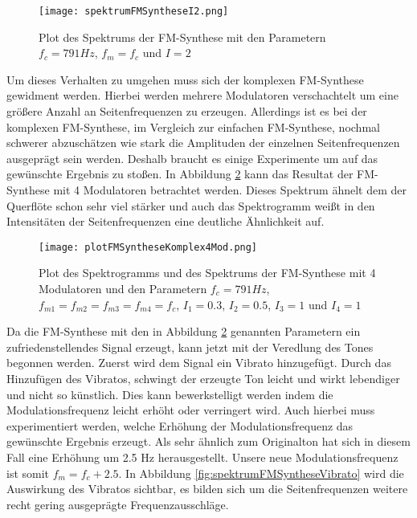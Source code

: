 \begin{figure} [ht]
\centering
  \texttt{[image: spektrumFMSyntheseI2.png]}
\caption{Plot des Spektrums der FM-Synthese mit den Parametern $f_c = 791 Hz$, $f_m = f_c$ und $I = 2$}
\label{fig:spektrumFMSyntheseI2}
\end{figure}

Um dieses Verhalten zu umgehen muss sich der komplexen FM-Synthese gewidment werden. Hierbei werden mehrere Modulatoren verschachtelt um eine größere Anzahl an Seitenfrequenzen zu erzeugen. Allerdings ist es bei der komplexen FM-Synthese, im Vergleich zur einfachen FM-Synthese, nochmal schwerer abzuschätzen wie stark die Amplituden der einzelnen Seitenfrequenzen ausgeprägt sein werden. Deshalb braucht es einige Experimente um auf das gewünschte Ergebnis zu stoßen. In Abbildung \ref{fig:plotFMSyntheseKomplex4Mod} kann das Resultat der FM-Synthese mit 4 Modulatoren betrachtet werden. Dieses Spektrum ähnelt dem der Querflöte schon sehr viel stärker und auch das Spektrogramm weißt in den Intensitäten der Seitenfrequenzen eine deutliche Ähnlichkeit auf.

\begin{figure} [ht]
\centering
  \texttt{[image: plotFMSyntheseKomplex4Mod.png]}
\caption{Plot des Spektrogramms und des Spektrums der FM-Synthese mit 4 Modulatoren und den Parametern $f_c = 791 Hz$, $f_{m1} = f_{m2} = f_{m3} = f_{m4} = f_c$, $I_1 = 0.3$, $I_2 = 0.5$, $I_3 = 1$ und $I_4 = 1$}
\label{fig:plotFMSyntheseKomplex4Mod}
\end{figure}

Da die FM-Synthese mit den in Abbildung \ref{fig:plotFMSyntheseKomplex4Mod} genannten Parametern ein zufriedenstellendes Signal erzeugt, kann jetzt mit der Veredlung des Tones begonnen werden. Zuerst wird dem Signal ein Vibrato hinzugefügt. Durch das Hinzufügen des Vibratos, schwingt der erzeugte Ton leicht und wirkt lebendiger und nicht so künstlich. Dies kann bewerkstelligt werden indem die Modulationsfrequenz leicht erhöht oder verringert wird. Auch hierbei muss experimentiert werden, welche Erhöhung der Modulationsfrequenz das gewünschte Ergebnis erzeugt. Als sehr ähnlich zum Originalton hat sich in diesem Fall eine Erhöhung um 2.5 Hz herausgestellt. Unsere neue Modulationsfrequenz ist somit $f_m = f_c + 2.5$. In Abbildung \ref{fig:spektrumFMSyntheseVibrato} wird die Auswirkung des Vibratos sichtbar, es bilden sich um die Seitenfrequenzen weitere recht gering ausgeprägte Frequenzausschläge.

